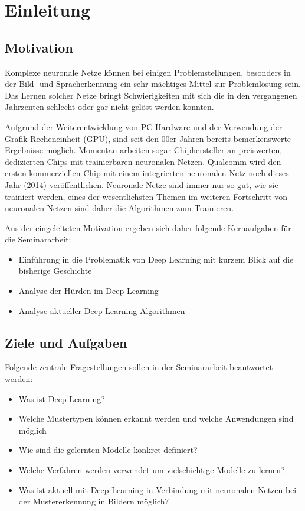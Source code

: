 \chapter{Einleitung}
\label{cha:einleitung}

\section{Motivation}

Komplexe neuronale Netze können bei einigen Problemstellungen, besonders in der Bild- und Spracherkennung ein sehr mächtiges Mittel zur Problemlösung sein. Das Lernen solcher Netze bringt Schwierigkeiten mit sich die in den vergangenen Jahrzenten schlecht oder gar nicht gelöst werden konnten.

Aufgrund der Weiterentwicklung von PC-Hardware und der Verwendung der Grafik-Recheneinheit (GPU), sind seit den 00er-Jahren bereits bemerkenswerte Ergebnisse möglich. Momentan arbeiten sogar Chiphersteller an preiswerten, dedizierten Chips mit trainierbaren neuronalen Netzen. Qualcomm wird den ersten kommerziellen Chip mit einem integrierten neuronalen Netz noch dieses Jahr (2014) veröffentlichen. Neuronale Netze sind immer nur so gut, wie sie trainiert werden, eines der wesentlichsten Themen im weiteren Fortschritt von neuronalen Netzen sind daher die Algorithmen zum Trainieren.

Aus der eingeleiteten Motivation ergeben sich daher folgende Kernaufgaben für die Seminararbeit:

\begin{itemize}
\item Einführung in die Problematik von Deep Learning mit kurzem Blick auf die bisherige Geschichte
\item Analyse der Hürden im Deep Learning
\item Analyse aktueller Deep Learning-Algorithmen
\end{itemize}

\section{Ziele und Aufgaben}

Folgende zentrale Fragestellungen sollen in der Seminararbeit beantwortet werden:
\begin{itemize}
\item Was ist Deep Learning?
\item Welche Mustertypen können erkannt werden und welche Anwendungen sind möglich
\item Wie sind die gelernten Modelle konkret definiert?
\item Welche Verfahren werden verwendet um vielschichtige Modelle zu lernen?
\item Was ist aktuell mit Deep Learning in Verbindung mit neuronalen Netzen bei der Mustererkennung in Bildern möglich?
\end{itemize}

